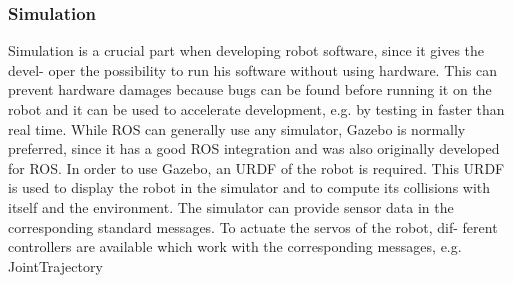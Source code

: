\subsubsection*{Simulation}
Simulation is a crucial part when developing robot software, since it gives the devel-
oper the possibility to run his software without using hardware.  This can prevent
hardware damages because bugs can be found before running it on the robot and
it can be used to accelerate development, e.g.  by testing in faster than real time.
While ROS can generally use any simulator, Gazebo is normally preferred, since it
has a good ROS integration and was also originally developed for ROS. In order to
use Gazebo, an URDF of the robot is required.
This  URDF  is  used  to  display  the  robot  in  the  simulator  and  to  compute  its
collisions with itself and the environment.  The simulator can provide sensor data
in  the  corresponding  standard  messages.   To  actuate  the  servos  of  the  robot,  dif-
ferent  controllers  are  available  which  work  with  the  corresponding  messages,  e.g.
JointTrajectory
